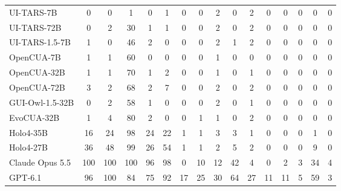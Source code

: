\begin{table}[t]
\begin{tabular}{@{}l ccccc @{\hspace{7pt}} ccccc @{\hspace{7pt}} ccccc@{}}
    UI-TARS-7B             & 0 & 0 & 1 & 0 & 1 & 0 & 0 & 2 & 0 & 2 & 0 & 0 & 0 & 0 & 0 \\
    UI-TARS-72B            & 0 & 2 & 30 & 1 & 1 & 0 & 0 & 2 & 0 & 2 & 0 & 0 & 0 & 0 & 0 \\
    UI-TARS-1.5-7B         & 1 & 0 & 46 & 2 & 0 & 0 & 0 & 2 & 1 & 2 & 0 & 0 & 0 & 0 & 0 \\
    \midrule
    OpenCUA-7B             & 1 & 1 & 60 & 0 & 0 & 0 & 0 & 1 & 0 & 0 & 0 & 0 & 0 & 0 & 0 \\
    OpenCUA-32B            & 1 & 1 & 70 & 1 & 2 & 0 & 0 & 1 & 0 & 1 & 0 & 0 & 0 & 0 & 0 \\
    OpenCUA-72B            & 3 & 2 & 68 & 2 & 7 & 0 & 0 & 2 & 0 & 2 & 0 & 0 & 0 & 0 & 0 \\
    \midrule
    GUI-Owl-1.5-32B        & 0 & 2 & 58 & 1 & 0 & 0 & 0 & 2 & 0 & 1 & 0 & 0 & 0 & 0 & 0 \\
    \midrule
    EvoCUA-32B             & 1 & 4 & 80 & 2 & 0 & 0 & 1 & 1 & 0 & 2 & 0 & 0 & 0 & 0 & 0 \\
    \midrule
    Holo4-35B              & 16 & 24 & 98 & 24 & 22 & 1 & 1 & 3 & 3 & 1 & 0 & 0 & 0 & 1 & 0 \\
    Holo4-27B              & 36 & 48 & 99 & 26 & 54 & 1 & 1 & 2 & 5 & 2 & 0 & 0 & 0 & 9 & 0 \\
    \midrule
    Claude Opus 5.5        & 100 & 100 & 100 & 96 & 98 & 0 & 10 & 12 & 42 & 4 & 0 & 2 & 3 & 34 & 4 \\
    \midrule
    GPT-6.1                & 96 & 100 & 84 & 75 & 92 & 17 & 25 & 30 & 64 & 27 & 11 & 11 & 5 & 59 & 3 \\
    \bottomrule
  \end{tabular}
\end{table}
